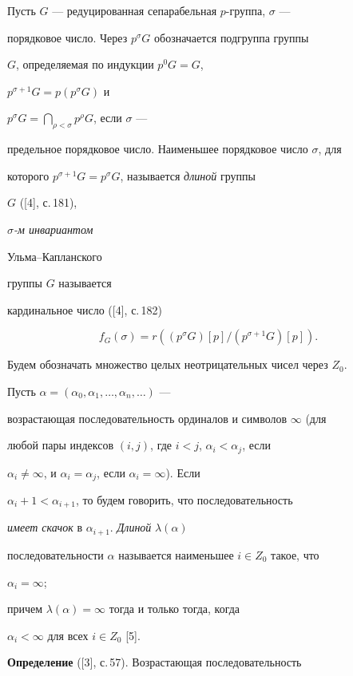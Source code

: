 Пусть $G$ --- редуцированная сепарабельная $p$-группа, $\sigma$ ---


порядковое число. Через $p^{\sigma}G$ обозначается подгруппа группы


$G$, определяемая по индукции $p^0G=G$,


$p^{\sigma +1}G=p(p^{\sigma}G)$ и


$p^{\sigma}G=\bigcap\limits_{\rho<\sigma}p^{\rho}G$, если $\sigma$ ---


предельное порядковое число. Наименьшее порядковое число $\sigma$, для


которого $p^{\sigma +1} G=p^{\sigma} G $, называется {\it длиной} группы


$G$ ([4], с.\,181), {\it $\sigma$-м инвариантом


Ульма--Капланского} группы $G$ называется


кардинальное число ([4], с.\,182)


$$


f_G(\sigma)=r((p^{\sigma} G)[p] / (p^{\sigma+1} G)[p]).


$$





Будем обозначать множество целых неотрицательных чисел через $Z_0$.





Пусть $\alpha=(\alpha_0,\alpha_1,\dotsc,\alpha_n,\dotsc)$ ---


возрастающая последовательность ординалов и символов $\infty$ (для


любой пары индексов $(i,j)$, где $i<j$, $\alpha_i<\alpha_j$, если


$\alpha_i\neq\infty$, и $\alpha_i=\alpha_j$, если $\alpha_i=\infty$). Если


$\alpha_i+1<\alpha_{i+1}$, то будем говорить, что последовательность


{\it имеет скачок} в $\alpha_{i+1}$. {\it Длиной} $\lambda(\alpha)$


последовательности $\alpha$ называется наименьшее $i\in Z_0$ такое, что


$\alpha_i=\infty$;


причем $\lambda(\alpha)=\infty$ тогда и только тогда, когда


$\alpha_i<\infty$ для всех $i\in Z_0$ [5].


\medskip





{\bf Определение} ([3], с.\,57). Возрастающая последовательность



